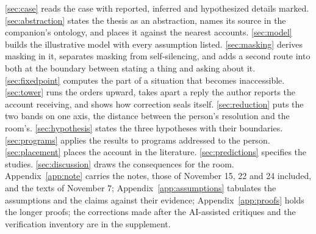 \autoref{sec:case} reads the case with reported, inferred and hypothesized details marked. \autoref{sec:abstraction} states the thesis as an abstraction, names its source in the companion's ontology, and places it against the nearest accounts. \autoref{sec:model} builds the illustrative model with every assumption listed. \autoref{sec:masking} derives masking in it, separates masking from self-silencing, and adds a second route into both at the boundary between stating a thing and asking about it. \autoref{sec:fixedpoint} computes the part of a situation that becomes inaccessible. \autoref{sec:tower} runs the orders upward, takes apart a reply the author reports the account receiving, and shows how correction seals itself. \autoref{sec:reduction} puts the two bands on one axis, the distance between the person's resolution and the room's. \autoref{sec:hypothesis} states the three hypotheses with their boundaries. \autoref{sec:programs} applies the results to programs addressed to the person. \autoref{sec:placement} places the account in the literature. \autoref{sec:predictions} specifies the studies. \autoref{sec:discussion} draws the consequences for the room. Appendix~\ref{app:note} carries the notes, those of November 15, 22 and 24 included, and the texts of November 7; Appendix~\ref{app:assumptions} tabulates the assumptions and the claims against their evidence; Appendix~\ref{app:proofs} holds the longer proofs; the corrections made after the AI-assisted critiques and the verification inventory are in the supplement.
